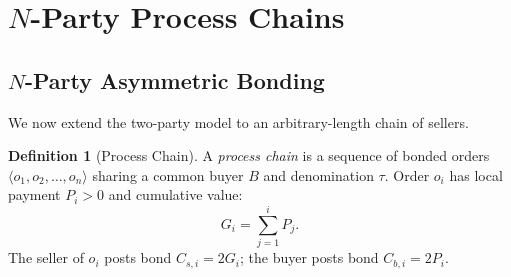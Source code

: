 \documentclass[11pt,a4paper]{article}
\theoremstyle{definition}
\newtheorem{definition}[theorem]{Definition}
\theoremstyle{remark}
\newcommand{\pay}{P}           %
\newcommand{\cumval}{G}        %
\begin{document}
\section{$N$-Party Process Chains}
\label{sec:process-trees}

\subsection{$N$-Party Asymmetric Bonding}

We now extend the two-party model to an arbitrary-length chain of
sellers.

\begin{definition}[Process Chain]
\label{def:process-chain}
A \emph{process chain} is a sequence of bonded orders
$\langle o_1, o_2, \ldots, o_n \rangle$ sharing a common buyer $B$ and
denomination $\tau$. Order $o_i$ has local payment $\pay_i > 0$ and
cumulative value:
\begin{equation}
  \cumval_i = \sum_{j=1}^{i} \pay_j.
  \label{eq:cumulative}
\end{equation}
The seller of $o_i$ posts bond $C_{s,i} = 2\cumval_i$; the buyer
posts bond $C_{b,i} = 2\pay_i$.
\end{definition}
\end{document}
